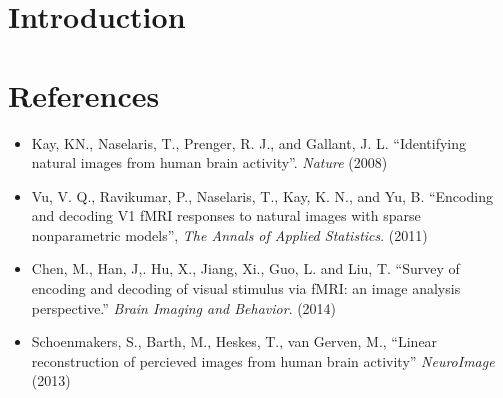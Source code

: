 \documentclass[11pt]{article}
\begin{document}
\section{Introduction}

\section{References}

\begin{itemize}
\item Kay, KN., Naselaris, T., Prenger, R. J., and Gallant, J. L.
  ``Identifying natural images from human brain
  activity''. \emph{Nature} (2008)
\item Vu, V. Q., Ravikumar, P., Naselaris, T., Kay, K. N., and Yu, B.
  ``Encoding and decoding V1 fMRI responses to natural images with
  sparse nonparametric models'', \emph{The Annals of Applied
    Statistics}. (2011)
\item Chen, M., Han, J,. Hu, X., Jiang, Xi., Guo, L. and Liu, T.
  ``Survey of encoding and decoding of visual stimulus via fMRI: an
  image analysis perspective.'' \emph{Brain Imaging and
    Behavior}. (2014)
\item Schoenmakers, S., Barth, M., Heskes, T., van Gerven, M.,
  ``Linear reconstruction of percieved images from human brain
  activity'' \emph{NeuroImage} (2013)
\end{itemize}
\end{document}
